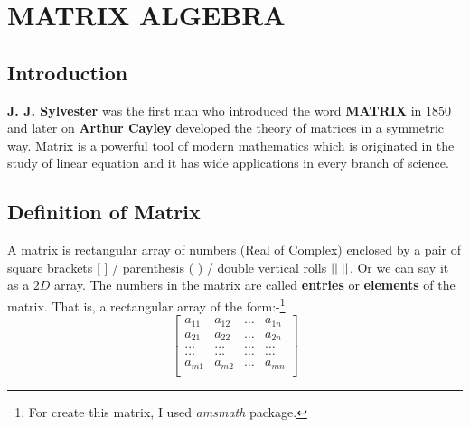 \documentclass[6 pt]{book}
\begin{document}
	\section*{MATRIX ALGEBRA}
		\subsection*{Introduction}
			\textbf{J. J. Sylvester} was the first man who introduced the word \textbf{MATRIX} in $1850$ and later on \textbf{Arthur Cayley} developed the theory of matrices in a symmetric way. Matrix is a powerful tool of modern mathematics which is originated in the study of linear equation and it has wide applications in every branch of science.
		\subsection*{Definition of Matrix}
			A matrix is rectangular array of numbers (Real of Complex) enclosed by a pair of square brackets [ ] / parenthesis ( ) / double vertical rolls $||\hspace{1mm}||$. Or we can say it as a $2D$ array. The numbers in the matrix are called \textbf{entries} or \textbf{elements} of the matrix. That is, a rectangular array of the form:-\footnote{For create this matrix, I used \textit{amsmath} package.}
			$$
			\begin{bmatrix}
				a_{11} & a_{12} & \dots & a_{1n}\\
				a_{21} & a_{22} & \dots & a_{2n}\\
				\dots & \dots & \dots & \dots\\
				\dots & \dots & \dots & \dots\\
				a_{m1} & a_{m2} & \dots & a_{mn}\\
			\end{bmatrix}
			$$
\end{document}
